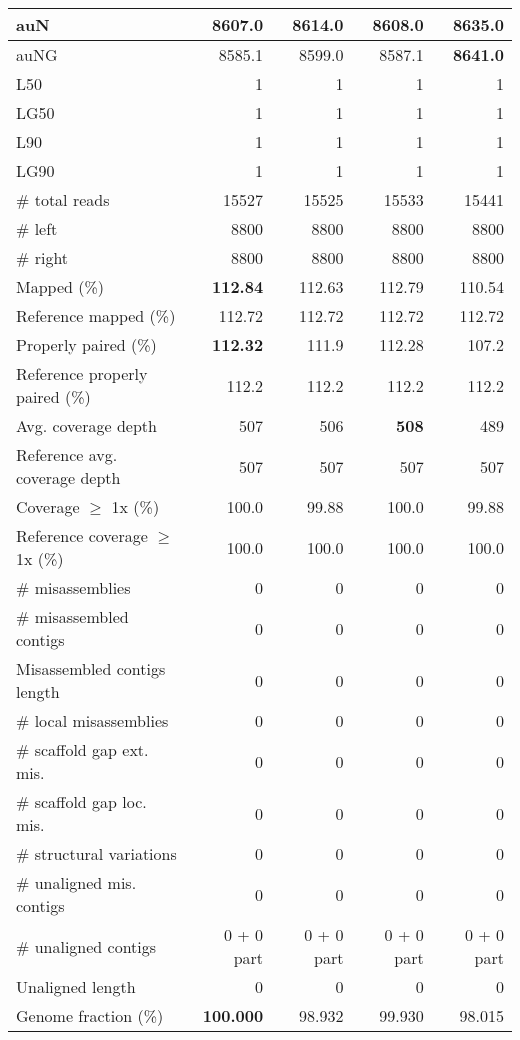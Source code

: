 \documentclass[12pt,a4paper]{article}
\begin{document}
\begin{table}[ht]
\begin{center}
\begin{tabular}{|l*{4}{|r}|}
auN & 8607.0 & 8614.0 & 8608.0 & {\bf 8635.0} \\ \hline
auNG & 8585.1 & 8599.0 & 8587.1 & {\bf 8641.0} \\ \hline
L50 & 1 & 1 & 1 & 1 \\ \hline
LG50 & 1 & 1 & 1 & 1 \\ \hline
L90 & 1 & 1 & 1 & 1 \\ \hline
LG90 & 1 & 1 & 1 & 1 \\ \hline
\# total reads & 15527 & 15525 & 15533 & 15441 \\ \hline
\# left & 8800 & 8800 & 8800 & 8800 \\ \hline
\# right & 8800 & 8800 & 8800 & 8800 \\ \hline
Mapped (\%) & {\bf 112.84} & 112.63 & 112.79 & 110.54 \\ \hline
Reference mapped (\%) & 112.72 & 112.72 & 112.72 & 112.72 \\ \hline
Properly paired (\%) & {\bf 112.32} & 111.9 & 112.28 & 107.2 \\ \hline
Reference properly paired (\%) & 112.2 & 112.2 & 112.2 & 112.2 \\ \hline
Avg. coverage depth & 507 & 506 & {\bf 508} & 489 \\ \hline
Reference avg. coverage depth & 507 & 507 & 507 & 507 \\ \hline
Coverage $\geq$ 1x (\%) & 100.0 & 99.88 & 100.0 & 99.88 \\ \hline
Reference coverage $\geq$ 1x (\%) & 100.0 & 100.0 & 100.0 & 100.0 \\ \hline
\# misassemblies & 0 & 0 & 0 & 0 \\ \hline
\# misassembled contigs & 0 & 0 & 0 & 0 \\ \hline
Misassembled contigs length & 0 & 0 & 0 & 0 \\ \hline
\# local misassemblies & 0 & 0 & 0 & 0 \\ \hline
\# scaffold gap ext. mis. & 0 & 0 & 0 & 0 \\ \hline
\# scaffold gap loc. mis. & 0 & 0 & 0 & 0 \\ \hline
\# structural variations & 0 & 0 & 0 & 0 \\ \hline
\# unaligned mis. contigs & 0 & 0 & 0 & 0 \\ \hline
\# unaligned contigs & 0 + 0 part & 0 + 0 part & 0 + 0 part & 0 + 0 part \\ \hline
Unaligned length & 0 & 0 & 0 & 0 \\ \hline
Genome fraction (\%) & {\bf 100.000} & 98.932 & 99.930 & 98.015 \\ \hline

\end{tabular}
\end{center}
\end{table}
\end{document}
